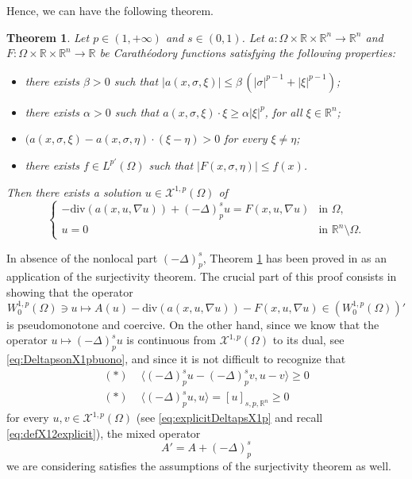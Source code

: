 \documentclass[11pt,a4paper]{amsart}
\theoremstyle{definition}
\theoremstyle{plain}
\newtheorem{theorem}[definition]{Theorem}
\numberwithin{equation}{section}
\begin{document}
{Hence, we can have the following theorem.  
  \begin{theorem}\label{thm:LerayLions}
  	Let $p \in (1,+\infty)$ and $s\in (0,1)$. Let $a:\Omega \times \mathbb{R}\times \mathbb{R}^{n} \to \mathbb{R}^{n}$ and $F:\Omega \times \mathbb{R}\times \mathbb{R}^{n} \to \mathbb{R}$ be Carath\'{e}odory functions satisfying the following properties:
  	\begin{itemize}
  		\item there exists $\beta>0$ such that $|a(x,\sigma,\xi)| \leq \beta \, (|\sigma|^{p-1}+ |\xi|^{p-1})$;
  		\item there exists $\alpha>0$ such that $a(x,\sigma,\xi) \cdot \xi \geq \alpha |\xi|^p$, for all $\xi \in \mathbb{R}^{n}$;
  		\item $(a(x,\sigma,\xi)-a(x,\sigma,\eta) \cdot (\xi -\eta) >0$ for every $\xi \neq \eta$;
  		\item there exists $f\in L^{p'}(\Omega)$ such that $|F(x,\sigma,\eta)|\leq f(x)$.
  	\end{itemize}
  	Then there exists a solution $u\in \mathcal{X}^{1,p}(\Omega)$ of  
  \begin{equation}\tag{mLL}\label{eq:MixedLerayLions}
  	\left\{ \begin{array}{rl}
  		-\mathrm{div}(a(x,u,\nabla u)) + (-\Delta)_{p}^{s} u = F(x,u,\nabla u) & \textrm{in } \Omega,\\
  		u=0 & \textrm{in } \mathbb{R}^{n}\setminus \Omega.
  	\end{array}\right.
  \end{equation}
  \end{theorem}
  	In absence of the nonlocal part $(-\Delta)_p^s$, Theorem \ref{thm:LerayLions} has been proved in \cite{LeLi} as an application of the surjectivity theorem. The crucial part of this proof consists in showing that the operator 
  	\begin{equation}
  		W_0^{1,p}(\Omega)\ni u\mapsto A(u)-\mathrm{div}(a(x,u,\nabla u)) - F(x,u,\nabla u)\in (W_0^{1,p}(\Omega))'
  	\end{equation}
  	\noindent is pseudomonotone and coercive. 
  	On the other hand,
  	since we know that the opera\-tor
  	 $u\mapsto (-\Delta)_p^s u$ is 
  	continuous from $\mathcal{X}^{1,p}(\Omega)$ to its dual,
  	see \eqref{eq:DeltapsonX1pbuono},
 and since it is not difficult to recognize that
  	\begin{align*}
  	(\ast)&\,\,\langle (-\Delta)^s_p u-(-\Delta)^s_p v, u-v\rangle \geq 0\\
  	(\ast)&\,\,\langle (-\Delta)^s_p u, u\rangle = [u]_{s,p,\mathbb{R}^n}\geq 0 	
  	\end{align*}
  	for every $u,v\in\mathcal{X}^{1,p}(\Omega)$ (see
  	\eqref{eq:explicitDeltapsX1p} and recall \eqref{eq:defX12explicit}),
  	 the mixed operator 
  	 $$A' = A+(-\Delta)^s_p$$ 
  	 we are  considering satisfies the assumptions of the surjectivity theorem as well.
  \vspace{0.1cm}
  
}
\end{document}
